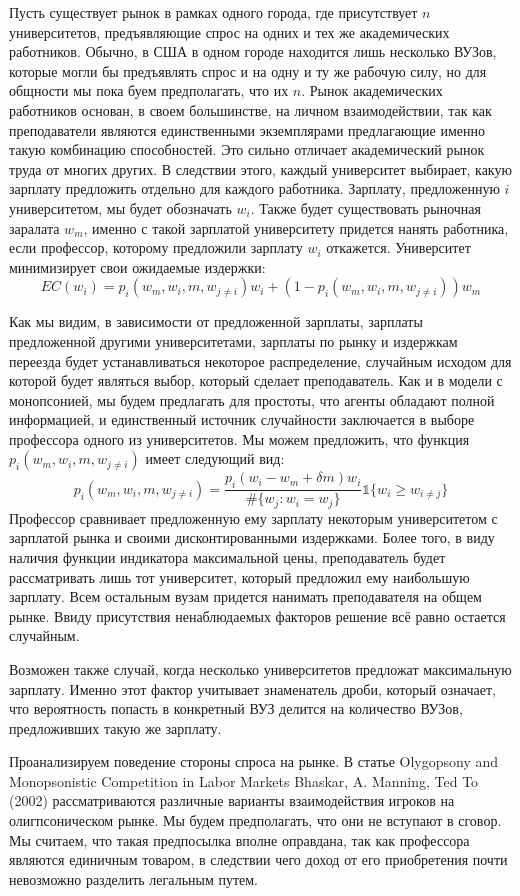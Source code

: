 \documentclass[a4paper, 12pt]{article}
\theoremstyle{definition}
\theoremstyle{plain}
\begin{document}
Пусть существует рынок в рамках одного города, где присутствует $n$ университетов, предъявляющие спрос на одних и тех же академических работников. Обычно, в США в одном городе находится лишь несколько ВУЗов, которые могли бы предъявлять спрос и на одну и ту же рабочую силу, но для общности мы пока буем предполагать, что их $n$. Рынок академических работников основан, в своем большинстве, на личном взаимодействии, так как преподаватели являются единственными экземплярами предлагающие именно такую комбинацию способностей. Это сильно отличает академический рынок труда от многих других. В следствии этого, каждый университет выбирает, какую зарплату предложить отдельно для каждого работника. Зарплату, предложенную $i$ университетом, мы будет обозначать $w_i$. Также будет существовать рыночная заралата $w_m$, именно с такой зарплатой университету придется нанять работника, если профессор, которому предложили зарплату $w_i$ откажется. Университет минимизирует свои ожидаемые издержки: 
\[
EC(w_i) = p_i(w_m, w_i, m, w_{j \neq i})w_i + (1 - p_i(w_m, w_i, m, w_{j \neq i}))w_m
\]

Как мы видим, в зависимости от предложенной зарплаты, зарплаты предложенной другими университетами, зарплаты по рынку и издержкам переезда будет устанавливаться некоторое распределение, случайным исходом для которой будет являться выбор, который сделает преподаватель. Как и в модели с монопсонией, мы будем предлагать для простоты, что агенты обладают полной информацией, и единственный источник случайности заключается в выборе профессора одного из университетов. Мы можем предложить, что функция $p_i ( w_m, w_i, m, w_{j \neq i}) $ имеет следующий вид: 
\[
p_i( w_m, w_i, m, w_{j \neq i}) = \frac{p_i(w_i - w_m + \delta m) w_i}{\#\{w_j : w_i = w_j\}}\mathds{1} \{ w_i \geq w_ {i \neq j}\}
\]
Профессор сравнивает предложенную ему зарплату некоторым университетом с зарплатой рынка и своими дисконтированными издержками. Более того, в виду наличия функции индикатора максимальной цены, преподаватель будет рассматривать лишь тот университет, который предложил ему наибольшую зарплату. Всем остальным вузам придется нанимать преподавателя на общем рынке. Ввиду присутствия ненаблюдаемых факторов решение всё равно остается случайным. 

Возможен также случай, когда несколько университетов предложат максимальную зарплату. Именно этот фактор учитывает знаменатель дроби, который означает, что вероятность попасть в конкретный ВУЗ делится на количество ВУЗов, предложивших такую же зарплату. 

Проанализируем поведение стороны спроса на рынке. В статье Olygopsony and Monopsonistic Competition in Labor Markets Bhaskar, A. Manning, Ted To (2002)  рассматриваются различные варианты взаимодействия игроков на олигпсоническом рынке.  Мы будем предполагать, что они не вступают в сговор. Мы считаем, что такая предпосылка вполне оправдана, так как профессора являются единичным товаром, в следствии чего доход от его приобретения почти невозможно разделить легальным путем. 
\end{document}
